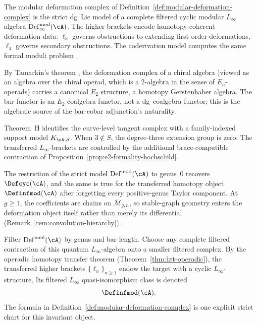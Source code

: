 \begin{remark}
\label{rem:deformation-complex-linfty}
The modular deformation complex of Definition~\ref{def:modular-deformation-complex}
is the strict dg~Lie model of a complete filtered cyclic modular $L_\infty$
algebra $\mathrm{Def}_\infty^{\mathrm{mod}}(\cA)$. The higher brackets
encode homotopy-coherent deformation data: $\ell_3$ governs
obstructions to extending first-order deformations, $\ell_4$ governs
secondary obstructions. The coderivation model computes the
same formal moduli problem \cite{KontsevichSoibelman}.

By Tamarkin's theorem \cite{Tamarkin00}, the deformation complex of a
chiral algebra (viewed as an algebra over the chiral operad, which is a
2-algebra in the sense of $E_n$-operads) carries a canonical $E_2$
structure, a homotopy Gerstenhaber algebra. The bar functor is an
$E_2$-coalgebra functor, not a dg~coalgebra functor; this is the algebraic
source of the bar-cobar adjunction's naturality.

Theorem~H identifies the curve-level tangent complex with a
family-indexed support model $K_{\cA,S}$.  When $3\notin S$, the
degree-three extension group is zero.  The transferred
$L_\infty$-brackets are controlled by the additional brace-compatible
contraction of Proposition~\ref{prop:e2-formality-hochschild}.
\end{remark}

\begin{remark}
\label{rem:modular-vs-cyclic-complex}
The restriction of the strict model
$\operatorname{Def}^{\mathrm{mod}}(\cA)$ to genus~$0$
recovers $\Defcyc(\cA)$, and the same is true for the transferred
homotopy object $\Definfmod(\cA)$ after forgetting every
positive-genus Taylor component. At $g \geq 1$, the coefficients are
chains on $\overline{\mathcal{M}}_{g,n}$, so stable-graph geometry
enters the deformation object itself rather than merely its differential
(Remark~\ref{rem:convolution-hierarchy}).
\end{remark}

\begin{construction}
\label{const:modular-homotopy-deformation-object}
Filter $\operatorname{Def}^{\mathrm{mod}}(\cA)$ by genus and
bar length. Choose any complete filtered contraction of this
quantum $L_\infty$-algebra onto a smaller filtered complex.
By the operadic homotopy transfer theorem
(Theorem~\ref{thm:htt-operadic}), the transferred higher
brackets $\{\ell_n\}_{n\ge 1}$ endow the target with a cyclic
$L_\infty$-structure. Its filtered $L_\infty$ quasi-isomorphism class
is denoted
\[
\Definfmod(\cA).
\]
The formula in
Definition~\ref{def:modular-deformation-complex} is one explicit
strict chart for this invariant object.
\end{construction}

